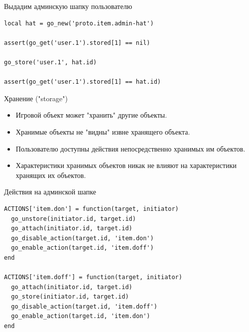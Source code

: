 \documentclass[aspectratio=169,handout,bigger]{beamer}
\begin{document}

\begin{frame}[fragile]{Выдадим админскую шапку пользователю}
\begin{verbatim}
local hat = go_new('proto.item.admin-hat')

assert(go_get('user.1').stored[1] == nil)

go_store('user.1', hat.id)

assert(go_get('user.1').stored[1] == hat.id)
\end{verbatim}
\end{frame}


\begin{frame}{Хранение ("storage")}
  \begin{itemize}
    \item Игровой объект может "хранить" другие объекты.
    \item Хранимые объекты не "видны" извне хранящего объекта.
    \item Пользователю доступны действия
          непосредственно хранимых им объектов.
    \item Характеристики хранимых объектов никак не влияют
          на характеристики хранящих их объектов.
  \end{itemize}
\end{frame}


\begin{frame}[fragile]{Действия на админской шапке}
\begin{verbatim}
ACTIONS['item.don'] = function(target, initiator)
  go_unstore(initiator.id, target.id)
  go_attach(initiator.id, target.id)
  go_disable_action(target.id, 'item.don')
  go_enable_action(target.id, 'item.doff')
end

ACTIONS['item.doff'] = function(target, initiator)
  go_attach(initiator.id, target.id)
  go_store(initiator.id, target.id)
  go_disable_action(target.id, 'item.doff')
  go_enable_action(target.id, 'item.don')
end
\end{verbatim}
\end{frame}

\end{document}
